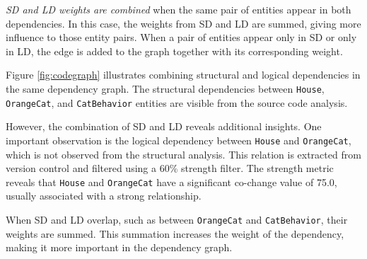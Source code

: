 \textit{SD and LD weights are combined} when the same pair of entities appear in both dependencies. In this case, the weights from SD and LD are summed, giving more influence to those entity pairs. When a pair of entities appear only in SD or only in LD, the edge is added to the graph together with its corresponding weight.

Figure \ref{fig:codegraph} illustrates combining structural and logical dependencies in the same dependency graph. The structural dependencies between \texttt{House}, \texttt{OrangeCat}, and \texttt{CatBehavior} entities are visible from the source code analysis.

However, the combination of SD and LD reveals additional insights. One important observation is the logical dependency between \texttt{House} and \texttt{OrangeCat}, which is not observed from the structural analysis. This relation is extracted from version control and filtered using a 60\% strength filter. The strength metric reveals that \texttt{House} and \texttt{OrangeCat} have a significant co-change value of 75.0, usually associated with a strong relationship.

When SD and LD overlap, such as between \texttt{OrangeCat} and \texttt{CatBehavior}, their weights are summed. This summation increases the weight of the dependency, making it more important in the dependency graph.



